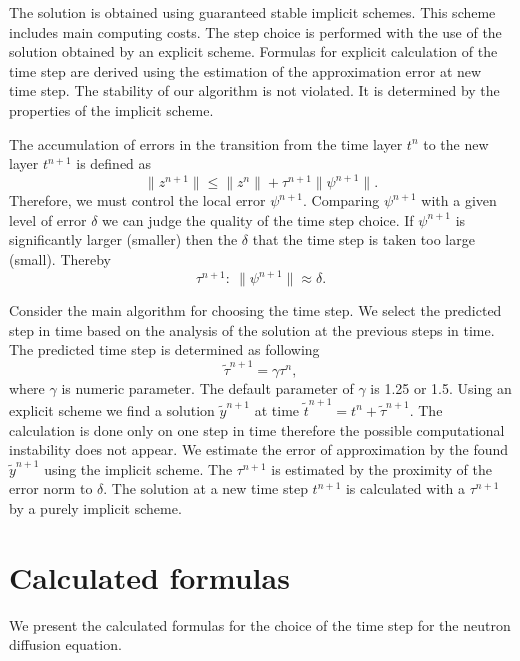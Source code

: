 \documentclass[runningheads]{llncs}
\begin{document}
The solution is obtained using guaranteed stable implicit schemes.
This scheme includes main computing costs.
The step choice is performed with the use of the solution obtained by an explicit scheme.
Formulas for explicit calculation of the time step are derived using the estimation of the approximation error at new time step.
The stability of our algorithm is not violated. 
It is determined by the properties of the implicit scheme.

The accumulation of errors in the transition from the time layer $t^n$ to the new layer $t^{n+1}$  is defined as
\begin{equation}
\|z^{n+1}\| \leq \|z^{n}\| + \tau^{n+1} \|\psi^{n+1}\| .
\end{equation}
Therefore, we must control the local error $\psi^{n+1}$. Comparing $\psi^{n+1}$ with a given level of error $\delta$ we can judge the quality of the time step choice. If $\psi^{n+1}$ is significantly larger (smaller) then the $\delta$ that the time step is taken too large (small). Thereby
\begin{equation}\label{9}
  \tau^{n+1}: \ \|\psi^{n+1}\| \approx \delta .
\end{equation} 

Consider the main algorithm for choosing the time step. We select the predicted step in time based on the analysis of the solution at the previous steps in time. The predicted time step is determined as following
\begin{equation}
 \widetilde{\tau}^{n+1} = \gamma \tau^n , 
\end{equation}
where $\gamma$ is numeric parameter. The default parameter of $\gamma$ is 1.25 or 1.5. Using an explicit scheme we find a solution $\widetilde{y}^{n+1}$ at time $\widetilde{t}^{n+1} = t^n + \widetilde{\tau}^{n+1}$. The calculation is done only on one step in time therefore the possible computational instability does not appear.
We estimate the error of approximation by the found $\widetilde{y}^{n+1}$ using the implicit scheme. The $\tau^{n+1}$ is estimated by the proximity of the error norm to $\delta$. The solution at a new time step $t^{n+1}$ is calculated with a $\tau^{n+1}$  by a purely implicit scheme.

\section{Calculated formulas}

We present the calculated formulas for the choice of the time step for the neutron diffusion equation.
\end{document}

